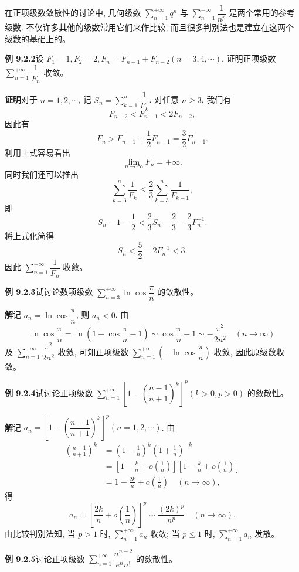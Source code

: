 \documentclass[UTF8, 12pt, fontset=fandol, oneside]{ctexart}
\begin{document}
在正项级数敛散性的讨论中, 几何级数 $\sum\limits_{n=1}^{+\infty}q^n$ 与 $\sum\limits_{n=1}^{+\infty}\dfrac1{n^p}$ 是两个常用的参考级数. 不仅许多其他的级数常用它们来作比较, 而且很多判别法也是建立在这两个级数的基础上的。

\noindent\textbf{例 9.2.2}\quad 设 $F_1=1,F_2=2,F_n=F_{n-1}+F_{n-2}(n=3,4,\cdots)$, 证明正项级数 $\sum\limits_{n=1}^{+\infty}\dfrac1{F_n}$ 收敛。

\noindent\textbf{证明}\quad 对于 $n=1,2,\cdots$, 记 $S_n=\sum\limits_{k=1}^n\dfrac1{F_k}$. 对任意 $n\geq3$, 我们有
\[
  F_{n-2}<F_{n-1}<2F_{n-2},
\]
因此有
\[
  F_n>F_{n-1}+\frac12F_{n-1}=\frac32F_{n-1}.
\]
利用上式容易看出
\[
  \lim_{n\to\infty}F_n=+\infty.
\]
同时我们还可以推出
\[
  \sum_{k=3}^n\frac1{F_k}\leq\frac23\sum_{k=3}^n\frac1{F_{k-1}},
\]
即
\[
  S_n-1-\frac12<\frac23S_n-\frac23-\frac23F_n^{-1}.
\]
将上式化简得
\[
  S_n<\frac52-2F_n^{-1}<3.
\]
因此 $\sum\limits_{n=1}^{+\infty}\dfrac1{F_n}$ 收敛。

\noindent\textbf{例 9.2.3}\quad 试讨论数项级数 $\sum\limits_{n=3}^{+\infty}\ln\cos\dfrac{\pi}{n}$ 的敛散性。

\noindent\textbf{解}\quad 记 $a_n=\ln\cos\dfrac{\pi}{n}$, 则 $a_n<0$. 由
\[
  \ln\cos\frac{\pi}{n}
  =\ln\left(1+\cos\frac{\pi}{n}-1\right)
  \sim \cos\frac{\pi}{n}-1\sim-\frac{\pi^2}{2n^2}\quad(n\to\infty)
\]
及 $\sum\limits_{n=1}^{+\infty}\dfrac{\pi^2}{2n^2}$ 收敛, 可知正项级数 $\sum\limits_{n=1}^{+\infty}\left(-\ln\cos\dfrac{\pi}{n}\right)$ 收敛, 因此原级数收敛。

\noindent\textbf{例 9.2.4}\quad 试讨论正项级数 $\sum\limits_{n=1}^{+\infty}\left[1-\left(\dfrac{n-1}{n+1}\right)^k\right]^p(k>0,p>0)$ 的敛散性。

\noindent\textbf{解}\quad 记 $a_n=\left[1-\left(\dfrac{n-1}{n+1}\right)^k\right]^p(n=1,2,\cdots)$. 由
\[
\begin{aligned}
  \left(\frac{n-1}{n+1}\right)^k
  &=\left(1-\frac1n\right)^k\left(1+\frac1n\right)^{-k}\\
  &=\left[1-\frac{k}{n}+o\left(\frac1n\right)\right]\left[1-\frac{k}{n}+o\left(\frac1n\right)\right]\\
  &=1-\frac{2k}{n}+o\left(\frac1n\right)\quad(n\to\infty),
\end{aligned}
\]
得
\[
  a_n=\left[\frac{2k}{n}+o\left(\frac1n\right)\right]^p\sim\frac{(2k)^p}{n^p}\quad(n\to\infty).
\]
由比较判别法知, 当 $p>1$ 时, $\sum\limits_{n=1}^{+\infty}a_n$ 收敛; 当 $p\leq1$ 时, $\sum\limits_{n=1}^{+\infty}a_n$ 发散。

\noindent\textbf{例 9.2.5}\quad 讨论正项级数 $\sum\limits_{n=1}^{+\infty}\dfrac{n^{n-2}}{e^n n!}$ 的敛散性。
\end{document}
